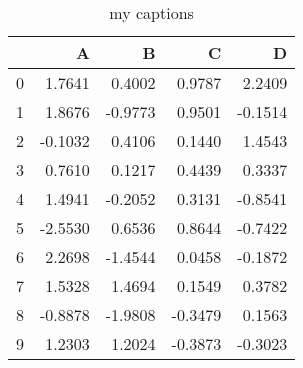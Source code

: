 \documentclass[10pt, oneside]{article}
\begin{document}
        
    \begin{table}
        \centering
        \caption{my captions}
        \begin{tabular}{lrrrr}
        \toprule
         & A & B & C & D \\
        \midrule
        0 & 1.7641 & 0.4002 & \color{white} {\cellcolor{blue}} \color{white} {\cellcolor{blue}} \color{white} {\cellcolor{blue}} \color{white} {\cellcolor{blue}} \color{white} {\cellcolor{blue}} 0.9787 & \color{white} {\cellcolor{blue}} \color{white} {\cellcolor{blue}} \color{white} {\cellcolor{blue}} \color{white} {\cellcolor{blue}} \color{white} {\cellcolor{blue}} 2.2409 \\
        1 & 1.8676 & \color{red} -0.9773 & 0.9501 & \color{red} -0.1514 \\
        2 & \color{red} -0.1032 & 0.4106 & 0.1440 & 1.4543 \\
        3 & 0.7610 & 0.1217 & 0.4439 & 0.3337 \\
        4 & 1.4941 & \color{red} -0.2052 & 0.3131 & \color{red} -0.8541 \\
        5 & \color{red} -2.5530 & 0.6536 & 0.8644 & \color{red} -0.7422 \\
        6 & \color{white} {\cellcolor{blue}} \color{white} {\cellcolor{blue}} \color{white} {\cellcolor{blue}} \color{white} {\cellcolor{blue}} \color{white} {\cellcolor{blue}} 2.2698 & \color{red} -1.4544 & 0.0458 & \color{red} -0.1872 \\
        7 & 1.5328 & \color{white} {\cellcolor{blue}} \color{white} {\cellcolor{blue}} \color{white} {\cellcolor{blue}} \color{white} {\cellcolor{blue}} \color{white} {\cellcolor{blue}} 1.4694 & 0.1549 & 0.3782 \\
        8 & \color{red} -0.8878 & \color{red} -1.9808 & \color{red} -0.3479 & 0.1563 \\
        9 & 1.2303 & 1.2024 & \color{red} -0.3873 & \color{red} -0.3023 \\
        \bottomrule
        \end{tabular}
        \end{table}
        
\end{document}
